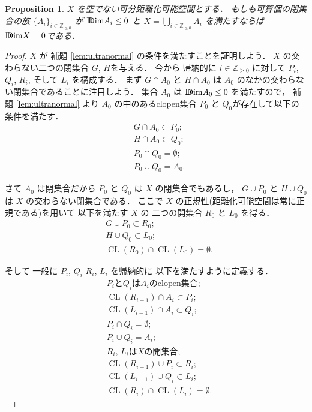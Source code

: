 \documentclass[leqno, a4paper, 12pt]{jsarticle}
\theoremstyle{plain}
\newtheorem{prop}[thm]{Proposition}
\theoremstyle{definition}
\theoremstyle{remark}
\newcommand{\zz}{\mathbb{Z}}
\DeclareMathOperator{\cl}{\mathrm{CL}}
\newcommand{\yoddim}{\mathrm{D\hspace{-5.5pt}Dim}}
\numberwithin{equation}{section}
\begin{document}
\begin{prop}\label{prop:sumn=0}
$X$
を空でない可分距離化可能空間とする．
もしも可算個の閉集合の族
$\{A_{i}\}_{i\in \zz_{\ge 0}}$
が
$\yoddim A_{i}\le 0$
と
$X=\bigcup_{i\in \zz_{\ge 0}}A_{i}$
を満たすならば
$\yoddim X= 0$である．
\end{prop}
\begin{proof}
$X$
が
補題 \ref{lem:ultranormal}
の条件を満たすことを証明しよう．
$X$
の交わらない二つの閉集合
$G$,
 $H$を与える．
 今から
帰納的に
$i\in \zz_{\ge 0}$
に対して
$P_{i}$, 
$Q_{i}$, 
$R_{i}$, 
そして
$L_{i}$
を構成する．
まず
$G\cap A_{0}$
と
$H\cap A_{0}$
は
$A_{0}$
のなかの交わらない閉集合であることに注目しよう．
集合
$A_{0}$
は
$\yoddim A_{0}\le 0$
を満たすので，
補題 \ref{lem:ultranormal}
より
$A_{0}$
の中のあるclopen集合
$P_{0}$
と
$Q_{0}$が存在して以下の条件を満たす．
\begin{align}
&G\cap A_{0}\subset P_{0};\\
&H\cap A_{0}\subset Q_{0};\\
&P_{0}\cap Q_{0}=\emptyset;\\
&P_{0}\cup Q_{0}=A_{0}. 
\end{align}


さて
$A_{0}$
は閉集合だから
$P_{0}$
と
$Q_{0}$
は
$X$
の閉集合でもあるし，
$G\cup P_{0}$
と
$H\cup Q_{0}$
は
$X$
の交わらない閉集合である．
ここで
$X$
の正規性(距離化可能空間は常に正規である)を用いて
以下を満たす
$X$
の
二つの開集合
$R_{0}$
と
$L_{0}$
を得る．
\begin{align}
&G\cup P_{0}\subset R_{0};\\
&H\cup Q_{0}\subset L_{0};\\
&\cl (R_{0})\cap \cl(L_{0})=\emptyset. 
\end{align}

そして
一般に
$P_{i}$, 
$Q_{i}$
$R_{i}$, 
$L_{i}$
を帰納的に
以下を満たすように定義する．
\begin{align}
&\text{$P_{i}$と$Q_{i}$
は$A_{i}$のclopen集合};\\
&\cl(R_{i-1})\cap A_{i}\subset P_{i};\\
&\cl(L_{i-1})\cap A_{i}\subset Q_{i};\\
&P_{i}\cap Q_{i}=\emptyset;\\
&P_{i}\cup Q_{i}=A_{i};\\
&\text{$R_{i}$, $L_{i}$
は$X$の開集合};\\
&\cl(R_{i-1})\cup P_{i}\subset R_{i};\\
&\cl(L_{i-1})\cup Q_{i}\subset L_{i};\\
&\cl(R_{i})\cap \cl(L_{i})=\emptyset. 
\end{align}




\end{proof}
\end{document}
